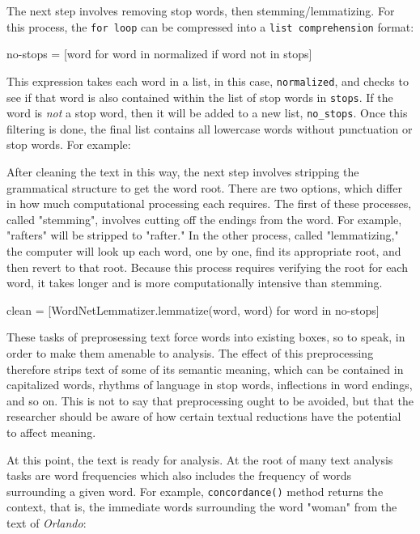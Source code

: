 \documentclass[11pt]{article}
\begin{document}
The next step involves removing stop words, then
stemming/lemmatizing. For this process, the \texttt{for loop} can be
compressed into a \texttt{list comprehension} format:

\begin{SOURCE}
no-stops = [word for word in normalized if word not in stops]
\end{SOURCE}

This expression takes each word in a list, in this case, \texttt{normalized},
and checks to see if that word is also contained within the list of
stop words in \texttt{stops}. If the word is \emph{not} a stop word, then it will
be added to a new list, \texttt{no\_stops}. Once this filtering is done, the
final list contains all lowercase words without punctuation or stop
words. For example:

\begin{SOURCE}
\end{SOURCE}

After cleaning the text in this way, the next step involves stripping
the grammatical structure to get the word root. There are two options,
which differ in how much computational processing each requires. The
first of these processes, called "stemming", involves cutting off the
endings from the word. For example, "rafters" will be stripped to
"rafter." In the other process, called "lemmatizing," the computer
will look up each word, one by one, find its appropriate root, and
then revert to that root. Because this process requires verifying the
root for each word, it takes longer and is more computationally
intensive than stemming.

\begin{SOURCE}
clean = [WordNetLemmatizer.lemmatize(word, word) for word in no-stops]
\end{SOURCE}

These tasks of preprosessing text force words into existing boxes, so
to speak, in order to make them amenable to analysis. The effect of
this preprocessing therefore strips text of some of its semantic
meaning, which can be contained in capitalized words, rhythms of
language in stop words, inflections in word endings, and so on. This
is not to say that preprocessing ought to be avoided, but that the
researcher should be aware of how certain textual reductions have the
potential to affect meaning.

At this point, the text is ready for analysis. At the root of many
text analysis tasks are word frequencies which also includes the
frequency of words surrounding a given word. For example,
\texttt{concordance()} method returns the context, that is, the immediate
words surrounding the word "woman" from the text of \emph{Orlando}:
\end{document}
